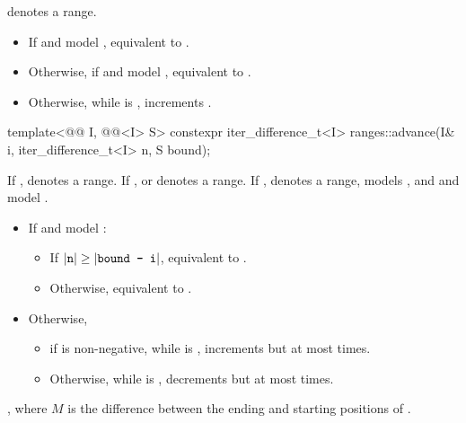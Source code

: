 \begin{itemdescr}
\pnum
\expects
{} denotes a range.

\pnum
\effects
\begin{itemize}
\item If  and  model ,
  equivalent to .
\item Otherwise, if  and  model ,
  equivalent to .
\item Otherwise, while  is ,
  increments .
\end{itemize}
\end{itemdescr}

%
\begin{itemdecl}
template<@@ I, @@<I> S>
  constexpr iter_difference_t<I> ranges::advance(I& i, iter_difference_t<I> n, S bound);
\end{itemdecl}

\begin{itemdescr}
\pnum
\expects
If ,  denotes a range.
If ,  or  denotes a range.
If ,  denotes a range,
 models , and
 and  model .

\pnum
\effects
\begin{itemize}
\item If  and  model :
  \begin{itemize}
  \item If \brk{}$|\texttt{n}| \ge |\texttt{bound - i}|$,
    equivalent to .
  \item Otherwise, equivalent to .
  \end{itemize}
\item Otherwise,
  \begin{itemize}
  \item if  is non-negative,
    while  is ,
    increments  but at most  times.
  \item Otherwise,
    while  is ,
    decrements  but at most  times.
  \end{itemize}
\end{itemize}

\pnum
\returns
{}, where $M$ is the difference between
the ending and starting positions of .
\end{itemdescr}

